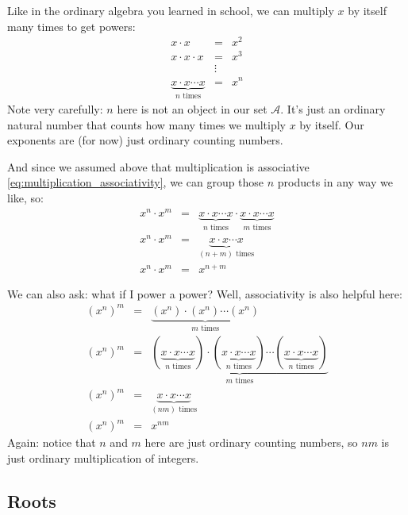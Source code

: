 Like in the ordinary algebra you learned in school, we can multiply $x$ by itself many times to get powers:
\begin{eqnarray*}
    x \cdot x &=& x^2 \\
    x \cdot x \cdot x &=& x^3 \\
     &\vdots& \nonumber \\
    \underbrace{x \cdot x \cdots x}_{n \text{ times}} &=& x^n
\end{eqnarray*}
Note very carefully: $n$ here is not an object in our set $\mathcal{A}$. It's just an ordinary natural number that counts how many times we multiply $x$ by itself. Our exponents are (for now) just ordinary counting numbers.

And since we assumed above that multiplication is associative \eqref{eq:multiplication_associativity}, we can group those $n$ products in any way we like, so:
\begin{eqnarray}
    x^n \cdot x^m &=& \underbrace{x \cdot x \cdots x}_{n \text{ times}} \cdot \underbrace{x \cdot x \cdots x}_{m \text{ times}} \nonumber \\
    x^n \cdot x^m &=& \underbrace{x \cdot x \cdots x}_{(n+m) \text{ times}} \nonumber \\
    \label{eq:exponent_addition}
    x^n \cdot x^m &=& x^{n+m}
\end{eqnarray}

We can also ask: what if I power a power? Well, associativity is also helpful here:
\begin{eqnarray}
    (x^n)^m &=& \underbrace{(x^n) \cdot (x^n) \cdots (x^n)}_{m \text{ times}} \nonumber \\
    (x^n)^m &=& \underbrace{(\underbrace{x \cdot x \cdots x}_{n \text{ times}}) \cdot (\underbrace{x \cdot x \cdots x}_{n \text{ times}}) \cdots (\underbrace{x \cdot x \cdots x}_{n \text{ times}})}_{m \text{ times}} \nonumber \\
    (x^n)^m &=& \underbrace{x \cdot x \cdots x}_{(nm) \text{ times}} \nonumber \\
    \label{eq:exponent_power}
    (x^n)^m &=& x^{nm}
\end{eqnarray}
Again: notice that $n$ and $m$ here are just ordinary counting numbers, so $nm$ is just ordinary multiplication of integers.

\subsection{Roots}


